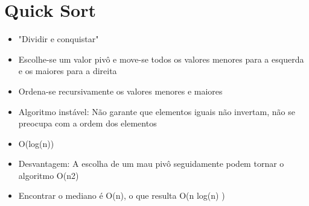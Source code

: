 \documentclass{article}
\begin{document}
\section{Quick Sort}
	\begin{itemize}
	\item "Dividir e conquistar"
	\item Escolhe-se um valor pivô e move-se todos os valores menores para a esquerda e os maiores para a direita
	\item Ordena-se recursivamente os valores menores e maiores
	\item Algoritmo instável: Não garante que elementos iguais não invertam, não se preocupa com a ordem dos elementos
	\item O(log(n))
	\item Desvantagem: A escolha de um mau pivô seguidamente podem tornar o algoritmo O(n2)
	\item Encontrar o mediano é O(n), o que resulta O(n log(n) ) 
	\end{itemize}
\end{document}
